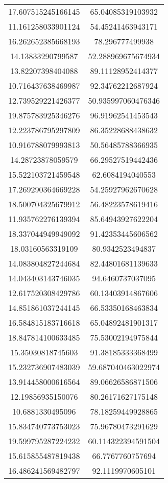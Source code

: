 \begin{table}
\begin{tabular}{cc}
17.607515245166145 & 65.04085319103932 \\
11.161258033901124 & 54.45241463943171 \\
16.262652385668193 & 78.296777499938 \\
14.13833290799587 & 52.288969675674934 \\
13.82207398404088 & 89.11128952414377 \\
10.716437638469987 & 92.34762212687924 \\
12.739529221426377 & 50.935997060476346 \\
19.875783925346276 & 96.91962541453543 \\
12.223786795297809 & 86.35228688438632 \\
10.916788079993813 & 50.56485788366935 \\
14.28723878059579 & 66.29527519442436 \\
15.522103721459548 & 62.6084194040553 \\
17.269290364669228 & 54.25927962670628 \\
18.500704325679912 & 56.48223578619416 \\
11.935762276139394 & 85.64943927622204 \\
18.337044949949092 & 91.42353445606562 \\
18.03160563319109 & 80.9342523494837 \\
14.083804827244684 & 82.44801681139633 \\
14.043403143746035 & 94.6460737037095 \\
12.617520308429786 & 60.13403914867606 \\
14.851861037244145 & 66.53350168463834 \\
16.584815183716618 & 65.04892481901317 \\
18.847814100633485 & 75.53002194975844 \\
15.35030818745603 & 91.38185333368499 \\
15.232736907483039 & 59.687040463022974 \\
13.914458000616564 & 89.06626586871506 \\
12.19856935150076 & 80.26171627175148 \\
10.6881330495096 & 78.18259449928865 \\
15.834740773753023 & 75.96780473291629 \\
19.599795287224232 & 60.114322394591504 \\
15.615855487819438 & 66.7767760757694 \\
16.486241569482797 & 92.1119970605101 \\

\end{tabular}
\end{table}
